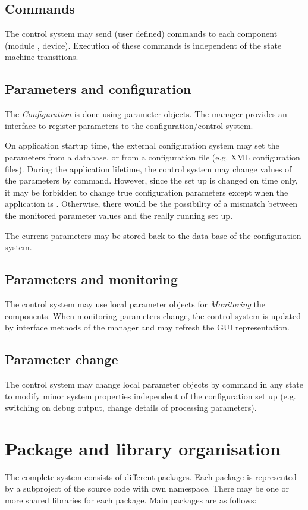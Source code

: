 \subsection{Commands}
The control system may send (user defined) commands to each 
   component (module , device). Execution of these commands is 
   independent of the state machine transitions.
\subsection{Parameters and configuration}
The {\sl Configuration} is done using parameter objects. The 
   manager provides an interface to register parameters to the
    configuration/control system.    

On application startup time, the external configuration system may 
      set the parameters from a database, or from a configuration file 
      (e.g. XML configuration files). During the application lifetime, the control system may change 
      values of the parameters by command. However, since the set 
      up is changed on  time only, it may be forbidden to change 
      true configuration parameters except when the application is . 
      Otherwise, there would be the possibility of a mismatch between the 
      monitored parameter values and the really running set up.

The current parameters  may be stored back to the data 
      base of the configuration system.

      
\subsection{Parameters and monitoring}
The control system may use local parameter objects for 
   {\sl Monitoring} the components. When monitoring parameters change, 
   the control system is updated by interface methods of the 
   manager and may refresh the GUI representation.

\subsection{Parameter change}
The control system may change local parameter objects 
   by command in any state to modify minor system properties 
   independent of the configuration set up (e.g. switching on 
   debug output, change details of processing parameters).


\section{Package and library organisation}
The complete system consists of different packages. 
Each package is represented by a subproject of the source code with own namespace. 
There may be one or more shared libraries for each package. Main packages are as follows: 

